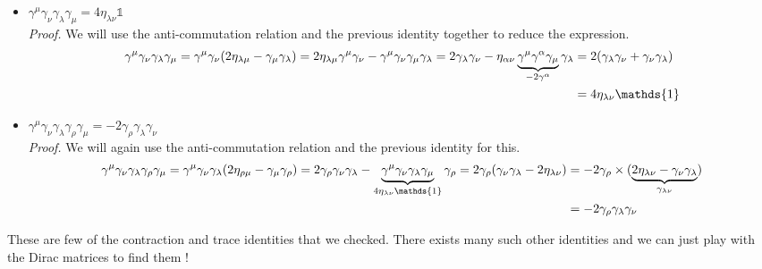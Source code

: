 \begin{itemize}
    \item $\gamma^\mu \gamma_\nu \gamma_\lambda \gamma_\mu = 4\eta_{\lambda \nu}\mathds{1}$\\[0.25cm]
    \textit{Proof.} We will use the anti-commutation relation and the previous identity together to reduce the expression. 
    \begin{align*}
        \gamma^\mu \gamma_\nu \gamma_\lambda \gamma_\mu = \gamma^\mu \gamma_\nu \qty(2\eta_{\lambda\mu} - \gamma_\mu \gamma_\lambda)=2\eta_{\lambda\mu}\gamma^{\mu}\gamma_{\nu} - \gamma^\mu \gamma_\nu \gamma_\mu \gamma_\lambda=2\gamma_\lambda \gamma_\nu - \eta_{\alpha\nu}\underbrace{\gamma^{\mu}\gamma^{\alpha}\gamma_\mu}_{-2\gamma^\alpha} \gamma_\lambda&=2\qty(\gamma_\lambda \gamma_\nu + \gamma_\nu\gamma_\lambda)\\ &=4\eta_{\lambda\nu}\mathds{1}
    \end{align*}
    \item $\gamma^\mu \gamma_\nu \gamma_\lambda \gamma_\rho \gamma_\mu = -2 \gamma_\rho \gamma_\lambda \gamma_\nu$\\[0.25cm]
    \textit{Proof.} We will again use the anti-commutation relation and the previous identity for this. 
    \begin{align*}
        \gamma^\mu \gamma_\nu \gamma_\lambda \gamma_\rho \gamma_\mu = \gamma^\mu \gamma_\nu \gamma_\lambda \qty(2\eta_{\rho\mu}-\gamma_\mu \gamma_\rho) = 2 \gamma_\rho \gamma_\nu \gamma_\lambda - \underbrace{\gamma^\mu \gamma_\nu \gamma_\lambda \gamma_\mu}_{4\eta_{\lambda\nu}\mathds{1}} \gamma_\rho =2\gamma_\rho\qty(\gamma_\nu \gamma_\lambda - 2\eta_{\lambda\nu}) &= -2\gamma_\rho \times ( \underbrace{2\eta_{\lambda\nu} -\gamma_\nu \gamma_\lambda}_{\gamma_{\lambda\nu}})\\  &= -2\gamma_\rho \gamma_\lambda \gamma_\nu
    \end{align*}
\end{itemize}
These are few of the contraction and trace identities that we checked. There exists many such other identities and we can just play with the Dirac matrices to find them !
